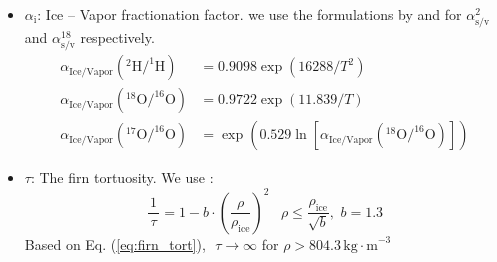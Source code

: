\documentclass[11pt, draftcls, onecolumn]{IEEEtran} %
\numberwithin{equation}{section}
\numberwithin{table}{section}
\numberwithin{figure}{section}
\begin{document}
\begin{appendices}
\begin{itemize}
\item{$\alpha_{\mathrm{i}}$: Ice -- Vapor fractionation factor.  we use the formulations by \cite{Majoube1971} 
and \cite{Merlivat1967} for $\alpha_{\mathrm{s/v}}^{2}$ and $\alpha_{\mathrm{s/v}}^{18}$ respectively.
\begin{align}
\alpha_{\mathrm{Ice/Vapor}} \left(^{2}\mathrm{H}/^{1} \mathrm{H} \right) &=0.9098\exp(16288/T^2)\\
\alpha_{\mathrm{Ice/Vapor}} \left( ^{18}\mathrm{O}/^{16} \mathrm{O} \right) &=  0.9722\exp(11.839/T)\\
\alpha_{\mathrm{Ice/Vapor}} \left( ^{17}\mathrm{O}/^{16} \mathrm{O}\right)  & = \exp\left(0.529\ln\left[\alpha_{\mathrm{Ice/Vapor}} \left( ^{18}\mathrm{O}/^{16} \mathrm{O} \right)\right] \right)
\label{eq1617_ch4_app}
\end{align}}

\item{$\tau$: The firn tortuosity. We use \citep{Schwander1988}:
\begin{equation}
\frac{\,1\,}{\,\tau\,} = 1 - b\cdot\left(\frac{\rho}{\rho_{\mathrm{ice}}}\right)^2 \,\,\,\,\,\rho \le 
\frac{\rho_{\mathrm{ice}}}{\sqrt{b}},\,\,b = 1.3
\label{eq:firn_tort}
\end{equation}
Based on Eq. (\ref{eq:firn_tort}), $\,\,\tau \rightarrow \infty$ for $\rho>804.3\,\mathrm{kg\cdot m}^{-3}$
}
	

\end{itemize}


\end{appendices}
\end{document}
